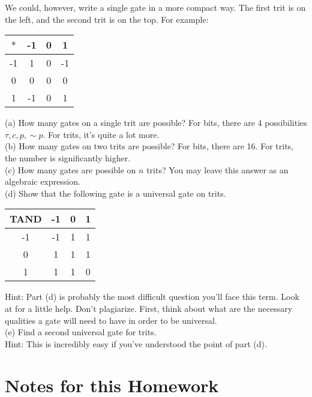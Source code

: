 \documentclass[16 pt]{amsart}
\theoremstyle{definition}
\theoremstyle{remark}
\numberwithin{equation}{subsection}
\begin{document}
We could, however, write a single gate in a more compact way.  The first trit is on the left, and the second trit is on the top.  For example: 



\begin{center}
\begin{tabular}{c | c  c  c}
$*$ & -1 & 0 & 1\\
\hline
-1 & 1 & 0 & -1\\
0 & 0 & 0 & 0\\
1 & -1 & 0 & 1
\end{tabular}
\end{center}


(a) How many gates on a single trit are possible?  For bits, there are 4 possibilities $\tau,c,p,\sim p$.  For trits, it's quite a lot more.\\


(b) How many gates on two trits are possible? For bits, there are 16.  For trits, the number is significantly higher.\\

(c) How many gates are possible on $n$ trits?   You may leave this answer as an algebraic expression.\\

(d) Show that the following gate is a universal gate on trits.

\begin{center}
\begin{tabular}{c | c c c }
TAND & -1 & 0 & 1\\
\hline
-1 & -1 & 1 & 1 \\
0  & 1  & 1 & 1\\
1  & 1  & 1 & 0
\end{tabular}
\end{center}  

Hint: Part (d) is probably the most difficult question you'll face this term.  Look at \cite{Tw} for a little help.  Don't plagiarize.  First, think about what are the necessary qualities a gate will need to have in order to be universal.\\

(e) Find a second universal gate for trits.\\
Hint: This is incredibly easy if you've understood the point of part (d).
\newpage

\section{Notes for this Homework}
\end{document}
